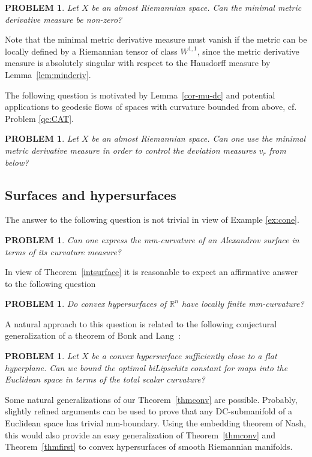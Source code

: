 \documentclass[12pt,leqno]{amsart}
\numberwithin{equation}{section}
\newtheorem{quest}[thm]{PROBLEM}
\theoremstyle{definition}
\theoremstyle{remark}
\newcommand{\tref}[1]{Theorem~\ref{#1}}
\newcommand{\lref}[1]{Lemma~\ref{#1}}
\newcommand{\R}{\mathbb{R}}
\begin{document}
\begin{quest} \label{qe:min}
Let $X$ be an almost Riemannian space. Can  the minimal metric derivative measure be non-zero?
\end{quest}

 Note that the minimal metric derivative measure must vanish if the metric can be locally defined  by a Riemannian
tensor of class $W^{1,1}$,  since the metric derivative measure is absolutely singular with respect to the Hausdorff measure by \lref{lem:minderiv}.




The following question is motivated by  \lref{cor-mu-dc}   and potential  applications to geodesic flows of spaces with curvature bounded from above, cf. Problem \ref{qe:CAT}.

\begin{quest}  \label{qe:BV}
Let $X$ be an  almost Riemannian space. Can one use the minimal metric derivative measure in order  to control the deviation measures $v_r$ from below?
\end{quest}

\subsection{Surfaces and  hypersurfaces}
The answer to the following question is not trivial in view of  Example \ref{ex:cone}.


\begin{quest}
Can one express the mm-curvature of an Alexandrov  surface in terms of its curvature measure?
\end{quest}

In view of \tref{intsurface} it is reasonable  to expect  an affirmative answer to the following question
\begin{quest}
Do  convex hypersurfaces of $\R^n$ have locally finite mm-curvature?
\end{quest}


 A natural approach to this question is related to  the following conjectural generalization of a theorem of Bonk and Lang~\cite{Bonk-Lang}:
 \begin{quest}
 Let $X$ be a convex hypersurface sufficiently close to a flat  hyperplane. Can we bound the optimal biLipschitz constant for maps into the Euclidean space in terms of the total scalar curvature?
 \end{quest}

Some natural generalizations of our \tref{thmconv} are possible. Probably, slightly refined arguments can be used to
prove that any DC-submanifold of a Euclidean space has trivial mm-boundary. Using the embedding theorem of Nash, this would also provide an easy generalization of \tref{thmconv} and \tref{thmfirst} to convex hypersurfaces of smooth Riemannian manifolds.
\end{document}
